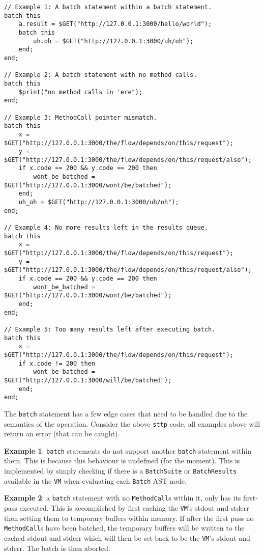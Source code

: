 \begin{verbatim}
// Example 1: A batch statement within a batch statement.
batch this
    a.result = $GET("http://127.0.0.1:3000/hello/world");
    batch this
        uh.oh = $GET("http://127.0.0.1:3000/uh/oh");
    end;
end;

// Example 2: A batch statement with no method calls.
batch this
    $print("no method calls in 'ere");
end;

// Example 3: MethodCall pointer mismatch.
batch this
    x = $GET("http://127.0.0.1:3000/the/flow/depends/on/this/request");
    y = $GET("http://127.0.0.1:3000/the/flow/depends/on/this/request/also");
    if x.code == 200 && y.code == 200 then
        wont_be_batched = $GET("http://127.0.0.1:3000/wont/be/batched");
    end;
    uh_oh = $GET("http://127.0.0.1:3000/uh/oh");
end;

// Example 4: No more results left in the results queue.
batch this
    x = $GET("http://127.0.0.1:3000/the/flow/depends/on/this/request");
    y = $GET("http://127.0.0.1:3000/the/flow/depends/on/this/request/also");
    if x.code == 200 && y.code == 200 then
        wont_be_batched = $GET("http://127.0.0.1:3000/wont/be/batched");
    end;
end;

// Example 5: Too many results left after executing batch.
batch this
    x = $GET("http://127.0.0.1:3000/the/flow/depends/on/this/request");
    if x.code != 200 then
        wont_be_batched = $GET("http://127.0.0.1:3000/will/be/batched");
    end;
end;
\end{verbatim}

The \verb|batch| statement has a few edge cases that need to be handled due to the semantics of the operation. Consider the above \verb|sttp| code, all examples above will return an error (that can be caught).

\textbf{Example 1}: \verb|batch| statements do not support another \verb|batch| statement within them. This is because this behaviour is undefined (for the moment). This is implemented by simply checking if there is a \verb|BatchSuite| or \verb|BatchResults| available in the \verb|VM| when evaluating each \verb|Batch| AST node.

\textbf{Example 2}: a \verb|batch| statement with no \verb|MethodCall|s within it, only has its first-pass executed. This is accomplished by first caching the \verb|VM|'s stdout and stderr then setting them to temporary buffers within memory. If after the first pass no \verb|MethodCall|s have been batched, the temporary buffers will be written to the cached stdout and stderr which will then be set back to be the \verb|VM|'s stdout and stderr. The batch is then aborted.

